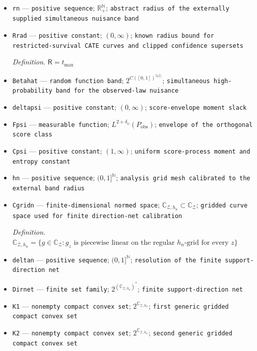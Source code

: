 \documentclass{article}
\begin{document}
\begin{itemize}
  \item \texttt{rn} --- \texttt{positive sequence}; \(\mathbb R_+^{\mathbb N}\); \texttt{abstract radius of the externally supplied simultaneous nuisance band}
  \item \texttt{Rrad} --- \texttt{positive constant}; \((0,\infty)\); \texttt{known radius bound for restricted-\allowbreak{}survival CATE curves and clipped confidence supersets}
  \par\smallskip\noindent\emph{Definition.} \(\mathsf R=t_{\max}\)
  \item \texttt{Betahat} --- \texttt{random function band}; \(2^{C([0,1])^{5|\mathcal Z|}}\); \texttt{simultaneous high-\allowbreak{}probability band for the observed-\allowbreak{}law nuisance}
  \item \texttt{deltapsi} --- \texttt{positive constant}; \((0,\infty)\); \texttt{score-\allowbreak{}envelope moment slack}
  \item \texttt{Fpsi} --- \texttt{measurable function}; \(L^{2+\delta_\psi}(P_{\mathrm{obs}})\); \texttt{envelope of the orthogonal score class}
  \item \texttt{Cpsi} --- \texttt{positive constant}; \((1,\infty)\); \texttt{uniform score-\allowbreak{}process moment and entropy constant}
  \item \texttt{hn} --- \texttt{positive sequence}; \((0,1]^{\mathbb N}\); \texttt{analysis grid mesh calibrated to the external band radius}
  \item \texttt{Cgridn} --- \texttt{finite-\allowbreak{}dimensional normed space}; \(\mathbb C_{\mathcal Z,h_n}\subset\mathbb C_{\mathcal Z}\); \texttt{gridded curve space used for finite direction-\allowbreak{}net calibration}
  \par\smallskip\noindent\emph{Definition.} \(\mathbb C_{\mathcal Z,h_n}=\{g\in\mathbb C_{\mathcal Z}:g_z\text{ is piecewise linear on the regular }h_n\text{-grid for every }z\}\)
  \item \texttt{deltan} --- \texttt{positive sequence}; \((0,1]^{\mathbb N}\); \texttt{resolution of the finite support-\allowbreak{}direction net}
  \item \texttt{Dirnet} --- \texttt{finite set family}; \(2^{(\mathbb C_{\mathcal Z,h_n})^*}\); \texttt{finite support-\allowbreak{}direction net}
  \item \texttt{K1} --- \texttt{nonempty compact convex set}; \(2^{\mathbb C_{\mathcal Z,h_n}}\); \texttt{first generic gridded compact convex set}
  \item \texttt{K2} --- \texttt{nonempty compact convex set}; \(2^{\mathbb C_{\mathcal Z,h_n}}\); \texttt{second generic gridded compact convex set}

\end{itemize}
\end{document}
